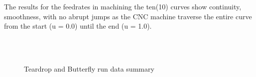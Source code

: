 The results for the feedrates in machining the ten(10) curves show continuity, smoothness, with no abrupt jumps as the CNC machine traverse the entire curve from the start (u = 0.0) until the end (u = 1.0).	\vspace*{1\baselineskip}
		










\pagebreak





\pagebreak



\pagebreak

\begin{figure}[htbp]
\begin{center}
	\\
	\\
	\caption{Teardrop and Butterfly run data summary}
	\label{fig:Teardrop and Butterfly run data summary.png}
\end{center}
\end{figure}


